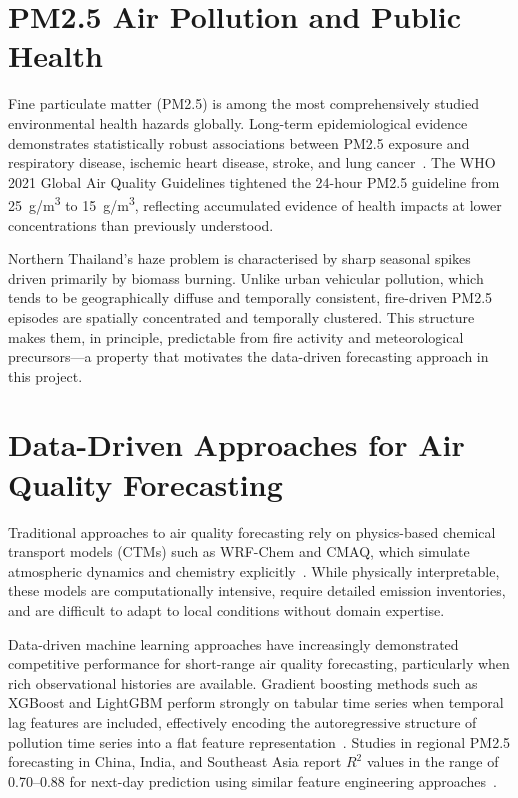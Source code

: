 \documentclass[12pt,a4paper]{report}
\begin{document}
\section{PM2.5 Air Pollution and Public Health}

Fine particulate matter (PM2.5) is among the most comprehensively studied environmental health hazards globally. Long-term epidemiological evidence demonstrates statistically robust associations between PM2.5 exposure and respiratory disease, ischemic heart disease, stroke, and lung cancer~\cite{who2021}. The WHO 2021 Global Air Quality Guidelines tightened the 24-hour PM2.5 guideline from 25~\textmu g/m\textsuperscript{3} to 15~\textmu g/m\textsuperscript{3}, reflecting accumulated evidence of health impacts at lower concentrations than previously understood.

Northern Thailand's haze problem is characterised by sharp seasonal spikes driven primarily by biomass burning. Unlike urban vehicular pollution, which tends to be geographically diffuse and temporally consistent, fire-driven PM2.5 episodes are spatially concentrated and temporally clustered. This structure makes them, in principle, predictable from fire activity and meteorological precursors---a property that motivates the data-driven forecasting approach in this project.

\section{Data-Driven Approaches for Air Quality Forecasting}

Traditional approaches to air quality forecasting rely on physics-based chemical transport models (CTMs) such as WRF-Chem and CMAQ, which simulate atmospheric dynamics and chemistry explicitly~\cite{seinfeld2016}. While physically interpretable, these models are computationally intensive, require detailed emission inventories, and are difficult to adapt to local conditions without domain expertise.

Data-driven machine learning approaches have increasingly demonstrated competitive performance for short-range air quality forecasting, particularly when rich observational histories are available. Gradient boosting methods such as XGBoost and LightGBM perform strongly on tabular time series when temporal lag features are included, effectively encoding the autoregressive structure of pollution time series into a flat feature representation~\cite{chen2016xgboost}. Studies in regional PM2.5 forecasting in China, India, and Southeast Asia report $R^2$ values in the range of 0.70--0.88 for next-day prediction using similar feature engineering approaches~\cite{liang2020}.
\end{document}
